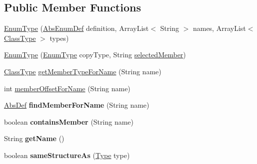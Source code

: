 \subsection*{Public Member Functions}
\begin{DoxyCompactItemize}
\item 
\hyperlink{classcompiler_1_1seman_1_1type_1_1_enum_type_aed957839a01ce4250e5ece5fe8a33cc4}{Enum\+Type} (\hyperlink{classcompiler_1_1abstr_1_1tree_1_1def_1_1_abs_enum_def}{Abs\+Enum\+Def} definition, Array\+List$<$ String $>$ names, Array\+List$<$ \hyperlink{classcompiler_1_1seman_1_1type_1_1_class_type}{Class\+Type} $>$ types)
\item 
\hyperlink{classcompiler_1_1seman_1_1type_1_1_enum_type_ac721d471ef958eb1d784f4e8e990b135}{Enum\+Type} (\hyperlink{classcompiler_1_1seman_1_1type_1_1_enum_type}{Enum\+Type} copy\+Type, String \hyperlink{classcompiler_1_1seman_1_1type_1_1_enum_type_aaf99c0618eb46bcfee4982085e9b4086}{selected\+Member})
\item 
\hyperlink{classcompiler_1_1seman_1_1type_1_1_class_type}{Class\+Type} \hyperlink{classcompiler_1_1seman_1_1type_1_1_enum_type_ae95232173956bde3df8ef9f9022a31ff}{get\+Member\+Type\+For\+Name} (String name)
\item 
int \hyperlink{classcompiler_1_1seman_1_1type_1_1_enum_type_a903e0511a0b519220354690f2ca0867e}{member\+Offset\+For\+Name} (String name)
\item 
\mbox{\label{classcompiler_1_1seman_1_1type_1_1_enum_type_a0080f439513ed0af65198c7309e17ad1}} 
\hyperlink{classcompiler_1_1abstr_1_1tree_1_1def_1_1_abs_def}{Abs\+Def} {\bfseries find\+Member\+For\+Name} (String name)
\item 
\mbox{\label{classcompiler_1_1seman_1_1type_1_1_enum_type_a17870dcfa073bd215972ae9d91c2fda6}} 
boolean {\bfseries contains\+Member} (String name)
\item 
\mbox{\label{classcompiler_1_1seman_1_1type_1_1_enum_type_a51d9efd67e40b068fe17deb5f07e6560}} 
String {\bfseries get\+Name} ()
\item 
\mbox{\label{classcompiler_1_1seman_1_1type_1_1_enum_type_a9206a1e93a9aa67a5c8420ea92234594}} 
boolean {\bfseries same\+Structure\+As} (\hyperlink{classcompiler_1_1seman_1_1type_1_1_type}{Type} type)

\end{DoxyCompactItemize}
